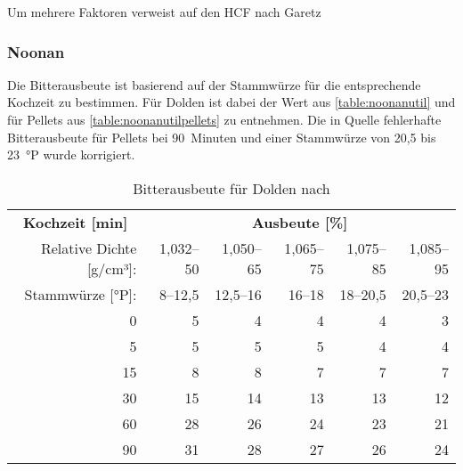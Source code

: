 \documentclass[a4paper,parskip=half]{scrartcl}
\begin{document}
\parencite[86]{Daniels1996}
Um mehrere Faktoren verweist auf den HCF nach Garetz

\subsubsection*{Noonan}

Die Bitterausbeute ist basierend auf der Stammwürze für die entsprechende
Kochzeit zu bestimmen. Für Dolden ist dabei der Wert aus \autoref{table:noonanutil}
und für Pellets aus \autoref{table:noonanutilpellets} zu entnehmen.
Die in Quelle fehlerhafte Bitterausbeute für Pellets bei 90~Minuten und einer
Stammwürze von 20,5 bis 23~°P wurde korrigiert.

\begin{table}[H]
\centering
\begin{tabular}{rrrrrr} 
\toprule
\multicolumn{1}{c}{\textbf{Kochzeit [min]}} & \multicolumn{5}{c}{\textbf{Ausbeute [\%]}}                                 \\
Relative Dichte [g/cm³]:                    & 1,032–50 & 1,050–65 & 1,065–75 & 1,075–85 & 1,085–95  \\
Stammwürze [°P]:                    & 8–12,5 & 12,5–16 & 16–18 & 18–20,5 & 20,5–23  \\
\midrule                                             
0                                            & 5        & 4        & 4                            & 4                            & 3                             \\
5                                            & 5        & 5        & 5                            & 4                            & 4                             \\
15                                           & 8        & 8        & 7                            & 7                            & 7                             \\
30                                           & 15       & 14       & 13                           & 13                           & 12                            \\
60                                           & 28       & 26       & 24                           & 23                           & 21                            \\
90                                           & 31       & 28       & 27                           & 26                           & 24                            \\
\bottomrule
\end{tabular}
\caption{Bitterausbeute für Dolden nach \citeauthor{Noonan1996} \parencite[215]{Noonan1996}}
\label{table:noonanutil}
\end{table}
\end{document}
